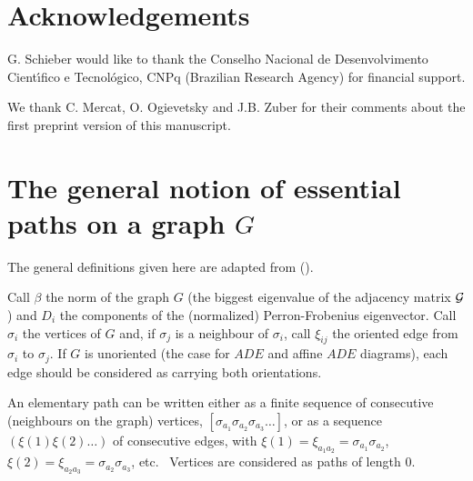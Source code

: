 \documentclass[a4paper,11pt]{article}
\let\sect=\section
\def\section{\newpage\sect}
\def\etc{{\rm etc.\/}\ }
\begin{document}

\section{Acknowledgements}

G. Schieber would like to thank the Conselho Nacional de Desenvolvimento
Cient\'{\i}fico e Tecnol\'ogico, CNPq (Brazilian Research Agency) for financial
support.

We thank C. Mercat, O. Ogievetsky and J.B. Zuber for their comments about the first preprint version
of this manuscript.


\appendix

\section{The general notion of essential paths on a graph $G$}

The general definitions given here are adapted from (\cite{Ocneanu:paths}).

Call $\beta$ the norm of the graph $G$ (the biggest eigenvalue of  the
adjacency matrix ${\cal G}$)
and  $D_{i}$ the components of the (normalized) Perron-Frobenius eigenvector.
Call $\sigma_{i}$ the vertices of $G$ and, if
$\sigma_{j}$ is a neighbour of
$\sigma_{i}$, call $\xi_{ij}$ the oriented edge
from $\sigma_{i}$ to $\sigma_{j}$. If $G$ is unoriented (the case for $ADE$
and affine $ADE$ diagrams), each edge should be considered  as carrying
both orientations.

An elementary path can be written either as a finite
sequence of consecutive (neighbours on the graph) vertices,
$[\sigma_{a_1} \sigma_{a_2} \sigma_{a_3} \ldots ]$,
or as a sequence $(\xi(1)\xi(2)\ldots)$ of consecutive edges, with
$\xi(1) = \xi_{a_{1}a_{2}}= \sigma_{a_1} \sigma_{a_2} $,
$\xi(2) = \xi_{a_{2}a_{3}} = \sigma_{a_2}  \sigma_{a_3} $, \etc
Vertices are considered as paths of length $0$.
\end{document}
